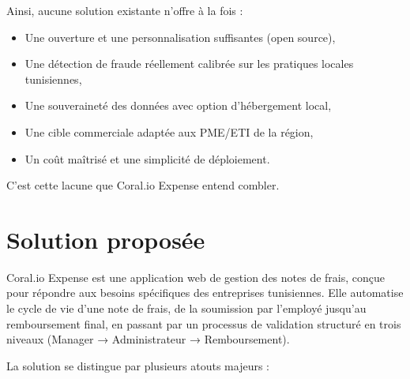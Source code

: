 \documentclass[12pt,a4paper]{report}
\begin{document}
Ainsi, aucune solution existante n'offre à la fois :

\begin{itemize}

 \item Une ouverture et une personnalisation suffisantes (open source),

 \item Une détection de fraude réellement calibrée sur les pratiques locales tunisiennes,

 \item Une souveraineté des données avec option d'hébergement local,

 \item Une cible commerciale adaptée aux PME/ETI de la région,

 \item Un coût maîtrisé et une simplicité de déploiement.

\end{itemize}

C'est cette lacune que Coral.io Expense entend combler.



\section{Solution proposée}

Coral.io Expense est une application web de gestion des notes de frais, conçue pour répondre aux besoins spécifiques des entreprises tunisiennes. Elle automatise le cycle de vie d'une note de frais, de la soumission par l'employé jusqu'au remboursement final, en passant par un processus de validation structuré en trois niveaux (Manager → Administrateur → Remboursement).



La solution se distingue par plusieurs atouts majeurs :
\end{document}
